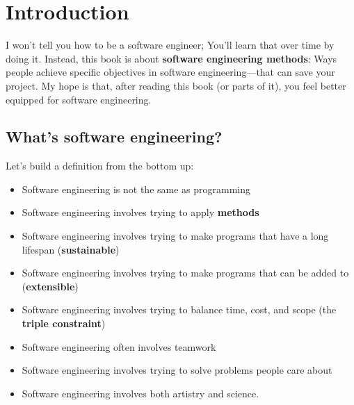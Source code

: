 \yesmargins

\chapter{Introduction}


I won't tell you how to be a software engineer; You'll learn that over time by doing it. Instead, this book is about \textbf{software engineering methods}: Ways people achieve specific objectives in software engineering---that can save your project. My hope is that, after reading this book (or parts of it), you feel better equipped for software engineering.

\section{What's software engineering?}

Let's build a definition from the bottom up:\\

\begin{itemize}
\item Software engineering is not the same as programming
\item Software engineering involves trying to apply \textbf{methods}
\item Software engineering involves trying to make programs that have a long lifespan (\textbf{sustainable})
\item Software engineering involves trying to make programs that can be added to\marginpar{\methodDef\margindivider}\marginpar{\sustainabilityDef\margindivider}\marginpar{\extensibleDef\margindivider}\marginpar{\tripleConstraintDef\margindivider}\marginpar{\softwareEngineeringDef} (\textbf{extensible})
\item Software engineering involves trying to balance time, cost, and scope (the \textbf{triple constraint})
\item Software engineering often involves teamwork
\item Software engineering involves trying to solve problems people care about
\item Software engineering involves both artistry and science.
\end{itemize}

